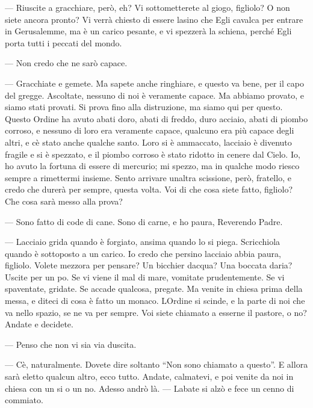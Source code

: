 --- Riuscite a gracchiare, però, eh? Vi sottometterete al giogo,
figliolo? O non siete ancora pronto? Vi verrà chiesto di essere
l\textquotesingle asino che Egli cavalca per entrare in Gerusalemme, ma
è un carico pesante, e vi spezzerà la schiena, perché Egli porta tutti i
peccati del mondo.

--- Non credo che ne sarò capace.

--- Gracchiate e gemete. Ma sapete anche ringhiare, e questo va bene,
per il capo del gregge. Ascoltate, nessuno di noi è veramente capace. Ma
abbiamo provato, e siamo stati provati. Si prova fino alla distruzione,
ma siamo qui per questo. Questo Ordine ha avuto abati
d\textquotesingle oro, abati di freddo, duro acciaio, abati di piombo
corroso, e nessuno di loro era veramente capace, qualcuno era più capace
degli altri, e c\textquotesingle è stato anche qualche santo.
L\textquotesingle oro si è ammaccato, l\textquotesingle acciaio è
divenuto fragile e si è spezzato, e il piombo corroso è stato ridotto in
cenere dal Cielo. Io, ho avuto la fortuna di essere di mercurio; mi
spezzo, ma in qualche modo riesco sempre a rimettermi insieme. Sento
arrivare un\textquotesingle altra scissione, però, fratello, e credo che
durerà per sempre, questa volta. Voi di che cosa siete fatto, figliolo?
Che cosa sarà messo alla prova?

--- Sono fatto di code di cane. Sono di carne, e ho paura, Reverendo
Padre.

--- L\textquotesingle acciaio grida quando è forgiato, ansima quando lo
si piega. Scricchiola quando è sottoposto a un carico. Io credo che
persino l\textquotesingle acciaio abbia paura, figliolo. Volete
mezz\textquotesingle ora per pensare? Un bicchier
d\textquotesingle acqua? Una boccata d\textquotesingle aria? Uscite per
un po\textquotesingle. Se vi viene il mal di mare, vomitate
prudentemente. Se vi spaventate, gridate. Se accade qualcosa, pregate.
Ma venite in chiesa prima della messa, e diteci di cosa è fatto un
monaco. L\textquotesingle Ordine si scinde, e la parte di noi che va
nello spazio, se ne va per sempre. Voi siete chiamato a esserne il
pastore, o no? Andate e decidete.

--- Penso che non vi sia via d\textquotesingle uscita.

--- C\textquotesingle è, naturalmente. Dovete dire soltanto ``Non sono
chiamato a questo''. E allora sarà eletto qualcun altro, ecco tutto.
Andate, calmatevi, e poi venite da noi in chiesa con un si o un no.
Adesso andrò là. --- L\textquotesingle abate si alzò e fece un cenno di
commiato.


